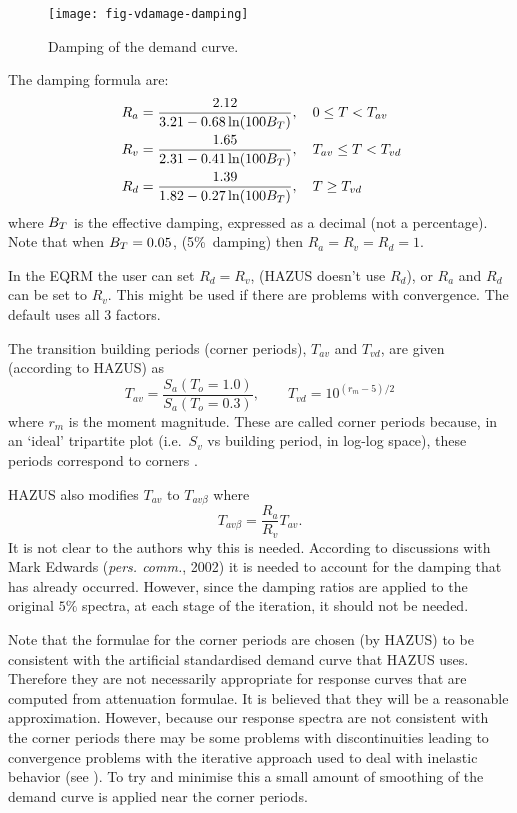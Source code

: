 \begin{figure}[htp]
\centering
{}
\texttt{[image: fig-vdamage-damping]}
\caption{Damping of the demand curve.}
\label{fig:v-dam-damping-adrs}
\end{figure}


The damping formula are:
\begin{align}
 R_a &= \frac{2.12}{3.21-0.68\ln(100\Beff)}, \quad 0\le T < T_{av}\\
\hspace{0.3em}
 R_v &= \frac{1.65}{2.31-0.41\ln(100\Beff)}, \quad T_{av}\le T < T_{vd}\\
\hspace{0.3em}
 R_d &= \frac{1.39}{1.82-0.27\ln(100\Beff)}, \quad T \ge T_{vd}
\end{align}
where $\Beff$ is the effective damping,
expressed as a decimal (not a percentage). Note that when $\Beff =
0.05$, (5\%\ damping) then $R_a=R_v=R_d=1$.

In the EQRM the user can set $R_d=R_v$, (HAZUS doesn't use $R_d$), or
$R_a$ and $R_d$ can be set to $R_v$. This might
be used if there are problems with convergence. The default
 uses all 3 factors.


The transition building periods (corner periods), $T_{av}$ and $T_{vd}$,
are given (according to HAZUS) as
\begin{equation}
 T_{av} = \frac{S_a(T_o =1.0)}{S_a(T_o =0.3)},
\qquad
 T_{vd} = 10^{(r_m-5)/2}
\end{equation}
where $r_m$ is the moment magnitude. These are called corner
periods because, in an `ideal' tripartite plot (i.e.~$S_v$ vs
building period, in log-log space), these periods correspond to
corners \citep{Newmark82}.

HAZUS also modifies $T_{av}$ to $T_{av\beta}$ where
$$
 T_{av\beta} = \frac{R_a}{R_v}T_{av}.
$$
It is not clear to the authors why this is needed. According to
discussions with Mark Edwards (\textit{pers. comm.}, 2002) it is
needed to account for the damping that has already occurred.
However, since the damping ratios are applied to the original
$5\%$ spectra, at each stage of the iteration, it should not be
needed.

Note that the formulae for the corner periods are chosen (by
HAZUS) to be consistent with the artificial standardised demand
curve that HAZUS uses. Therefore they are not
necessarily appropriate for response curves that are computed from
attenuation formulae. It is believed that they will be a
reasonable approximation. However, because our response spectra
are not consistent with the corner periods there may be some
problems with discontinuities leading to convergence problems with
the iterative approach used to deal with inelastic behavior (see
). To try and minimise this a small
amount of smoothing of the demand curve is
applied near the corner periods.


